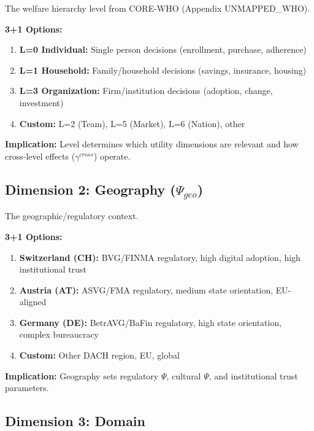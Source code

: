 The welfare hierarchy level from CORE-WHO (Appendix UNMAPPED_WHO).

\begin{tcolorbox}[colback=white, colframe=black,
    title=Dimension 1: Level Selection]
\textbf{3+1 Options:}
\begin{enumerate}
\item[$\square$] \textbf{L=0 Individual:} Single person decisions (enrollment, purchase, adherence)
\item[$\square$] \textbf{L=1 Household:} Family/household decisions (savings, insurance, housing)
\item[$\square$] \textbf{L=3 Organization:} Firm/institution decisions (adoption, change, investment)
\item[$\square$] \textbf{Custom:} L=2 (Team), L=5 (Market), L=6 (Nation), other
\end{enumerate}

\textbf{Implication:} Level determines which utility dimensions are relevant and
how cross-level effects ($\gamma^{cross}$) operate.
\end{tcolorbox}

\subsection{Dimension 2: Geography ($\Psi_{geo}$)}

The geographic/regulatory context.

\begin{tcolorbox}[colback=white, colframe=black,
    title=Dimension 2: Geography Selection]
\textbf{3+1 Options:}
\begin{enumerate}
\item[$\square$] \textbf{Switzerland (CH):} BVG/FINMA regulatory, high digital adoption, high institutional trust
\item[$\square$] \textbf{Austria (AT):} ASVG/FMA regulatory, medium state orientation, EU-aligned
\item[$\square$] \textbf{Germany (DE):} BetrAVG/BaFin regulatory, high state orientation, complex bureaucracy
\item[$\square$] \textbf{Custom:} Other DACH region, EU, global
\end{enumerate}

\textbf{Implication:} Geography sets regulatory $\Psi$, cultural $\Psi$, and
institutional trust parameters.
\end{tcolorbox}

\subsection{Dimension 3: Domain}


